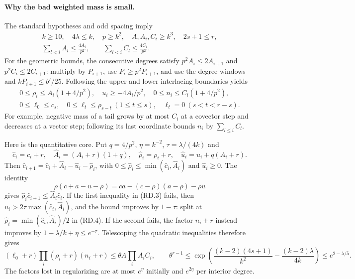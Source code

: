 \documentclass[11pt,a4paper]{article}
\numberwithin{equation}{section}
\theoremstyle{remark}\newtheorem{remark}[theorem]{Remark}
\begin{document}
\paragraph{Why the bad weighted mass is small.}
The standard hypotheses and odd spacing imply
\[
\begin{gathered}
 k\ge10,\quad 4\lambda\le k,\quad p\ge k^2,\quad
 A,A_i,C_i\ge k^3,\quad 2s+1\le r,\\
 \sum_{l<i}A_l\le\frac{4A_i}{p^2},\qquad
 \sum_{l<i}C_l\le\frac{4C_i}{p^2}.
\end{gathered}
\]
For the geometric bounds, the consecutive degrees satisfy
$p^2A_i\le2A_{i+1}$ and $p^2C_i\le2C_{i+1}$: multiply by
$P_{i+1}$, use $P_i\ge p^2P_{i+1}$, and use the degree windows and
$kP_{i+1}\le b'/25$.
Following the upper and lower interlacing boundaries yields
\[
\begin{gathered}
 0\le\rho_i\le A_i(1+4/p^2),\quad u_i\ge-4A_i/p^2,
 \quad0\le n_i\le C_i(1+4/p^2),\\
 0\le\ell_0\le c_s,\quad
 0\le\ell_t\le\rho_{s-t}\ (1\le t\le s),\quad
 \ell_t=0\ (s<t<r-s).
\end{gathered}
\]
For example, negative mass of a tail grows by at most $C_i$ at a
covector step and decreases at a vector step; following its last
coordinate bounds $n_i$ by $\sum_{l\le i}C_l$.

Here is the quantitative core. Put $q=4/p^2$, $\eta=k^{-2}$,
$\tau=\lambda/(4k)$ and
\[
 \widehat c_i=c_i+r,\quad \widehat A_i=(A_i+r)(1+q),\quad
 \widehat\rho_i=\rho_i+r,\quad\widehat u_i=u_i+q(A_i+r).
\]
Then $\widehat c_{i+1}=\widehat c_i+\widehat A_i-
\widehat u_i-\widehat\rho_i$, with
$0\le\widehat\rho_i\le\min(\widehat c_i,\widehat A_i)$ and
$\widehat u_i\ge0$. The identity
\[
 \rho(c+a-u-\rho)=ca-(c-\rho)(a-\rho)-\rho u
 \tag{RD.4}
\]
gives $\widehat\rho_i\widehat c_{i+1}\le
\widehat A_i\widehat c_i$. If the first inequality in (RD.3) fails,
then $\widehat u_i>2\tau\max(\widehat c_i,\widehat A_i)$,
and the bound improves by $1-\tau$: split at
$\widehat\rho_i=\min(\widehat c_i,\widehat A_i)/2$ in (RD.4).
If the second fails, the factor $n_i+r$ instead improves by
$1-\lambda/k+\eta\le e^{-\tau}$.
Telescoping the quadratic inequalities therefore gives
\[
 (\ell_0+r)\prod_i(\rho_i+r)(n_i+r)
 \le\theta A\prod_iA_iC_i,\qquad
 \theta^{r-1}\le
 \exp\!\left(\frac{(k-2)(4s+1)}{k^2}
             -\frac{(k-2)\lambda}{4k}\right)
 \le e^{2-\lambda/5}.
 \tag{RD.5}
\]
The factors lost in regularizing are at most $e^\eta$ initially and
$e^{2\eta}$ per interior degree.
\end{document}

